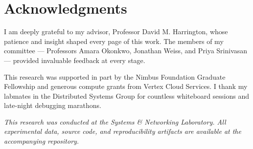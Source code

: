 \chapter*{Acknowledgments}

I am deeply grateful to my advisor, Professor David M. Harrington, whose
patience and insight shaped every page of this work. The members of my
committee --- Professors Amara Okonkwo, Jonathan Weiss, and Priya Srinivasan ---
provided invaluable feedback at every stage.

This research was supported in part by the Nimbus Foundation Graduate
Fellowship and generous compute grants from Vertex Cloud Services. I thank my
labmates in the Distributed Systems Group for countless whiteboard sessions and
late-night debugging marathons.

\vspace{1.5em}
\noindent
\begin{minipage}{0.85\textwidth}
\singlespacing
\begin{tcolorbox}[
  colback=uclagold!8,
  colframe=uclagold!40,
  boxrule=0.5pt,
  arc=2pt,
  left=8pt,
  right=8pt,
  top=6pt,
  bottom=6pt
]
\footnotesize\itshape\color{ucladark}
\textbf{\faUniversity}\quad This research was conducted at the
Systems \& Networking Laboratory. All experimental data, source code, and
reproducibility artifacts are available at the accompanying repository.
\end{tcolorbox}
\end{minipage}

